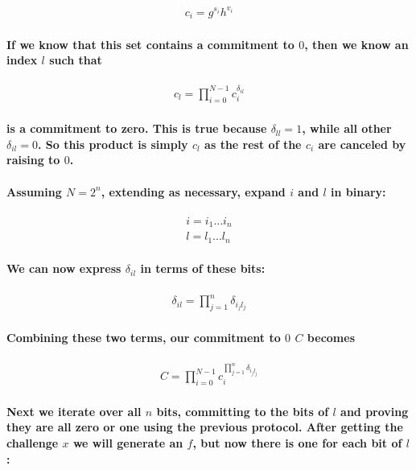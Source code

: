 \documentclass{article}
\begin{document}
\begin{eqnarray}
  c_i = g^{s_i} h^{v_i}
\end{eqnarray}

\paragraph{If we know that this set contains a commitment to $0$, then we know an index $l$ such that}

\begin{eqnarray}
  c_l = \prod_{i=0}^{N-1} c_i^{\delta_{il}}
\end{eqnarray}

\paragraph{is a commitment to zero.  This is true because $\delta_{ll} = 1$, while all other $\delta_{il} = 0$. So this product is simply $c_l$ as the rest of the $c_i$ are canceled by raising to $0$.}

\paragraph{Assuming $N = 2^n$, extending as necessary, expand $i$ and $l$ in binary:}

\begin{eqnarray}
  i = i_1...i_n\\
  l = l_1...l_n
\end{eqnarray}

\paragraph{We can now express $\delta_{il}$ in terms of these bits:}

\begin{eqnarray}
  \delta_{il} = \prod_{j=1}^{n} \delta_{i_jl_j}
\end{eqnarray}
  
\paragraph{Combining these two terms, our commitment to $0$ $C$ becomes}

\begin{eqnarray}
  C = \prod_{i=0}^{N-1}c_i^{\prod_{j=1}^{n} \delta_{i_jl_j}}
\end{eqnarray}

\paragraph{Next we iterate over all $n$ bits, committing to the bits of $l$ and proving they are all zero or one using the previous protocol.  After getting the challenge $x$ we will generate an $f$, but now there is one for each bit of $l$:}
\end{document}
